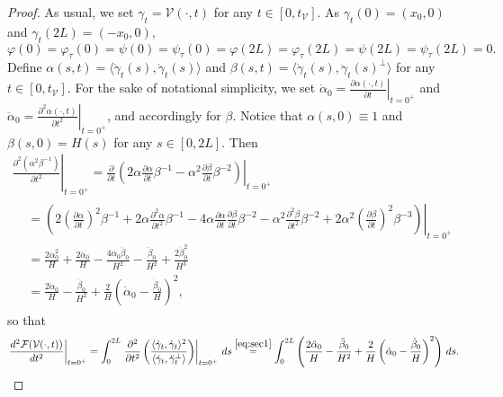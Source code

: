 \documentclass[11pt]{amsart}
\newcommand{\F}{\mathcal F}
\newcommand{\tv}{t_{\mathcal V}}
\theoremstyle{definition}
\theoremstyle{remark}
\numberwithin{equation}{section}
\begin{document}
\begin{proof}
As usual, we set $\gamma_t=\mathcal V(\cdot,t)$ for any $t\in[0,t_{\mathcal V}]$. As $\gamma_t(0)=(x_0,0)$ and $\gamma_t(2L)=(-x_0,0)$,
\begin{equation}\label{zeroorderbcsecondvar}
	\varphi(0)=\varphi_\tau(0)=\psi(0)=\psi_\tau(0)=\varphi(2L)=\varphi_\tau(2L)=\psi(2L)=\psi_\tau(2L)=0.
\end{equation}
Define $\alpha(s,t)=\langle\dot\gamma_t(s),\dot\gamma_t(s)\rangle$ and $\beta(s,t)=\langle\dot\gamma_t(s),\ddot\gamma_t(s)^\perp\rangle$ for any $t\in[0,\tv]$. For the sake of notational simplicity, we set $\dot\alpha_0=\left.\frac{\partial \alpha(\cdot,t)}{\partial t}\right|_{t=0^+}$ and $\ddot\alpha_0=\left.\frac{\partial^2 \alpha(\cdot,t)}{\partial t^2}\right|_{t=0^+}$, and accordingly for $\beta.$
Notice that $\alpha(s,0)\equiv 1$ and $\beta (s,0)=H(s)$ for any $s\in[0,2L]$. Then
\begin{multline}\label{eq:sec1}
	\left.\frac{\partial^2\left(\alpha^2\beta^{-1}\right)}{\partial t^2}\right|_{t=0^+}=\left.\frac{\partial}{\partial t}\left(2\alpha\frac{\partial\alpha}{\partial t}\beta^{-1}-\alpha^2\frac{\partial \beta}{\partial t}\beta^{-2}\right)\right|_{t=0^+}\\
	\begin{split}
		&=\left.\left(2\left(\frac{\partial \alpha}{\partial t}\right)^2\beta^{-1}+2\alpha\frac{\partial^2 \alpha}{\partial t^2}\beta^{-1}-4\alpha\frac{\partial \alpha}{\partial t}\frac{\partial \beta}{\partial t}\beta^{-2}-\alpha^2\frac{\partial^2\beta}{\partial t^2}\beta^{-2}+2\alpha^2\left(\frac{\partial \beta}{\partial t}\right)^2\beta^{-3}\right)\right|_{t=0^+}\\
		&=\frac{2\dot\alpha_0^2}{H}+\frac{2\ddot\alpha_0}{H}-\frac{4\dot\alpha_0\dot\beta_0}{H^2}-\frac{\ddot\beta_0}{H^2}+\frac{2\dot\beta_0^2}{H^3}\\
		&=\frac{2\ddot\alpha_0}{H}-\frac{\ddot\beta_0}{H^2}+\frac{2}{H}\left(\dot\alpha_0-\frac{\dot\beta_0}{H}\right)^2,
	\end{split}
\end{multline}
so that
\begin{equation}\label{firststepsecondvar}
	\left.\frac{d^2\F(\mathcal V(\cdot,t))}{dt^2}\right|_{t=0^+}=\int_{0}^{2L}\left.\frac{\partial^2 }{\partial t^2}\left(\frac{\langle\dot\gamma_t,\dot\gamma_t\rangle^2}{\langle\dot\gamma_t,\ddot\gamma_t^\perp\rangle}\right)\right|_{t=0^+}\,ds\overset{\eqref{eq:sec1}}{=}\int_0^{2L}\left(\frac{2\ddot\alpha_0}{H}-\frac{\ddot\beta_0}{H^2}+\frac{2}{H}\left(\dot\alpha_0-\frac{\dot\beta_0}{H}\right)^2\right)\,ds.

\end{equation}
\end{proof}
\end{document}

